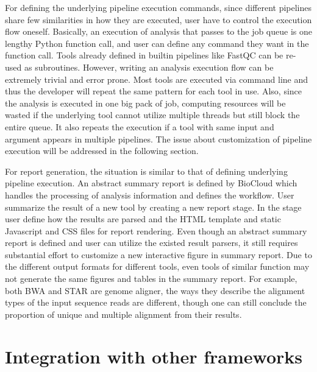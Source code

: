 For defining the underlying pipeline execution commands, since different
pipelines share few similarities in how they are executed, user have to control
the execution flow oneself. Basically, an execution of analysis that passes to
the job queue is one lengthy Python function call, and user can define any
command they want in the function call. Tools already defined in builtin
pipelines like FastQC can be re-used as subroutines. However, writing an
analysis execution flow can be extremely trivial and error prone. Most tools
are executed via command line and thus the developer will repeat the same
pattern for each tool in use. Also, since the analysis is executed in one big
pack of job, computing resources will be wasted if the underlying tool cannot
utilize multiple threads but still block the entire queue. It also repeats the
execution if a tool with same input and argument appears in multiple pipelines.
The issue about customization of pipeline execution will be addressed in the
following section.

For report generation, the situation is similar to that of defining underlying
pipeline execution. An abstract summary report is defined by BioCloud which
handles the processing of analysis information and defines the workflow. User
summarize the result of a new tool by creating a new report stage. In the stage
user define how the results are parsed and the HTML template and static
Javascript and CSS files for report rendering. Even though an abstract summary
report is defined and user can utilize the existed result parsers, it still
requires substantial effort to customize a new interactive figure in summary
report. Due to the different output formats for different tools, even tools of
similar function may not generate the same figures and tables in the summary
report. For example, both BWA and STAR are genome aligner, the ways they
describe the alignment types of the input sequence reads are different, though
one can still conclude the proportion of unique and multiple alignment from
their results.



\section{Integration with other frameworks}

